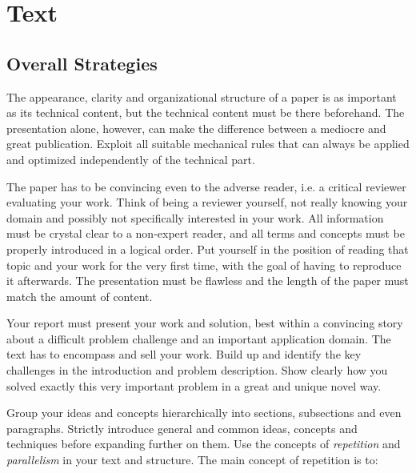 \documentclass[11pt, a4paper,oneside,chapterprefix=false]{scrbook}
\begin{document}
\section*{Text} \label{sec:text}

\subsection*{Overall Strategies}

The appearance, clarity and organizational structure of a paper is as important as its technical content, but the technical content must be there beforehand. The presentation alone, however, can make the difference between a mediocre and great publication. Exploit all suitable mechanical rules that can always be applied and optimized independently of the technical part.

The paper has to be convincing even to the adverse reader, i.e. a critical reviewer evaluating your work. Think of being a reviewer yourself, not really knowing your domain and possibly not specifically interested in your work. All information must be crystal clear to a non-expert reader, and all terms and concepts must be properly introduced in a logical order. Put yourself in the position of reading that topic and your work for the very first time, with the goal of having to reproduce it afterwards. The presentation must be flawless and the length of the paper must match the amount of content.

Your report must present your work and solution, best within a convincing story about a difficult problem challenge and an important application domain. The text has to encompass and sell your work. Build up and identify the key challenges in the introduction and problem description. Show clearly how you solved exactly this very important problem in a great and unique novel way.

Group your ideas and concepts hierarchically into sections, subsections and even paragraphs. Strictly introduce general and common ideas, concepts and techniques before expanding further on them. Use the concepts of \emph{repetition} and \emph{parallelism} in your text and structure. The main concept of repetition is to:
\end{document}
